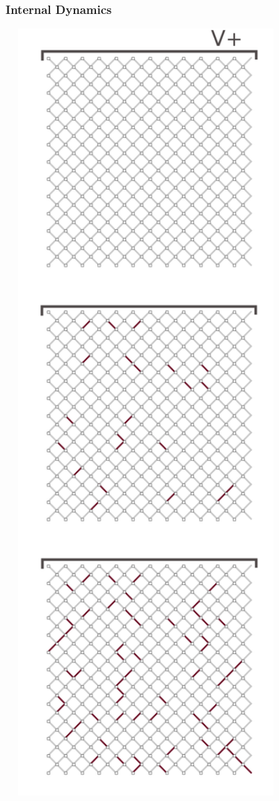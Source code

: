 \documentclass[mathserif]{beamer}
\begin{document}
\begin{frame}
\frametitle{Internal Dynamics}
\begin{center}
\includegraphics[width=0.8\textwidth]{Inside_a_network.png}
\end{center}
\end{frame}
\end{document}
